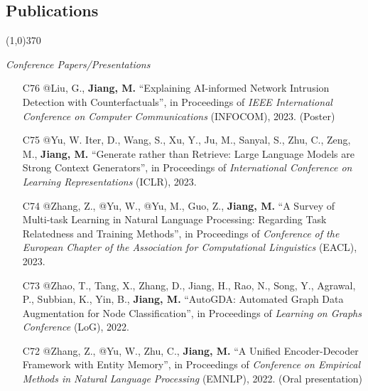 \documentclass[10pt]{article}
\newenvironment{myindentpar}[1]%
{\begin{list}{}%
         {\setlength{\leftmargin}{#1}}%
         \item[]%
}
{\end{list}}
\newcounter{list}
\begin{document}
\subsection{}
\subsection{\sc Publications}
\vspace{-0.4cm} \line(1,0){370} \vspace{-0.1cm}

\begin{myindentpar}{0.00cm}

\hspace{-0.25cm}\textit{Conference Papers/Presentations}

\begin{enumerate}[leftmargin=.5cm]

\item[C76] @Liu, G., \textbf{Jiang, M.} ``Explaining AI-informed Network Intrusion Detection with Counterfactuals'', in Proceedings of \textit{IEEE International Conference on Computer Communications} (INFOCOM), 2023. (Poster)
		
\item[C75] @Yu, W. Iter, D., Wang, S., Xu, Y., Ju, M., Sanyal, S., Zhu, C., Zeng, M., \textbf{Jiang, M.} ``Generate rather than Retrieve: Large Language Models are Strong Context Generators'', in Proceedings of \textit{International Conference on Learning Representations} (ICLR), 2023.

\item[C74] @Zhang, Z., @Yu, W., @Yu, M., Guo, Z., \textbf{Jiang, M.} ``A Survey of Multi-task Learning in Natural Language Processing: Regarding Task Relatedness and Training Methods'', in Proceedings of \textit{Conference of the European Chapter of the Association for Computational Linguistics} (EACL), 2023.

\item[C73] @Zhao, T., Tang, X., Zhang, D., Jiang, H., Rao, N., Song, Y., Agrawal, P., Subbian, K., Yin, B., \textbf{Jiang, M.} ``AutoGDA: Automated Graph Data Augmentation for Node Classification'', in Proceedings of \textit{Learning on Graphs Conference} (LoG), 2022.

\item[C72] @Zhang, Z., @Yu, W., Zhu, C., \textbf{Jiang, M.} ``A Unified Encoder-Decoder Framework with Entity Memory'', in Proceedings of \textit{Conference on Empirical Methods in Natural Language Processing} (EMNLP), 2022. (Oral presentation)


\end{enumerate}
\end{myindentpar}
\end{document}
